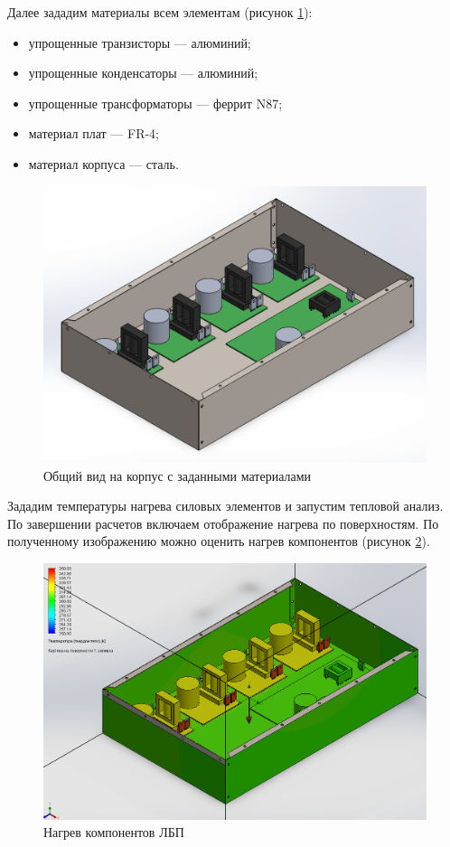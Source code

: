 \documentclass[utf8x, 14pt, oneside, a4paper]{article}
\begin{document}
		Далее зададим материалы всем элементам (рисунок \ref{fig:solid-bp-materials}):
		
		\begin{itemize}
			\item упрощенные транзисторы --- алюминий;
			\item упрощенные конденсаторы --- алюминий;
			\item упрощенные трансформаторы --- феррит N87;
			\item материал плат --- FR-4;
			\item материал корпуса --- сталь.
		\end{itemize}
	
		\begin{figure}[H]
			\centering
			\includegraphics[width=0.9\linewidth]{"Рисунки/Solid-bp-materials"}
			\caption{Общий вид на корпус с заданными материалами}
			\label{fig:solid-bp-materials}
		\end{figure}
	
		Зададим температуры нагрева силовых элементов и запустим тепловой анализ. По завершении расчетов включаем отображение нагрева по поверхностям. По полученному изображению можно оценить нагрев компонентов (рисунок \ref{fig:solid-bp-temp}).
		
		\begin{figure}[H]
			\centering
			\includegraphics[width=0.9\linewidth]{"Рисунки/Solid-bp-temp"}
			\caption{Нагрев компонентов ЛБП}
			\label{fig:solid-bp-temp}
		\end{figure}
	
\end{document}
